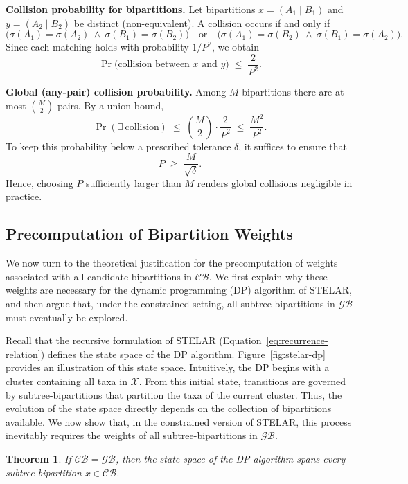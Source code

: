 \documentclass[runningheads]{llncs}
\newtheorem{theorem}{Theorem}[section]
\begin{document}
\textbf{Collision probability for bipartitions.}  
Let bipartitions $x=(A_1 \mid B_1)$ and $y=(A_2 \mid B_2)$ be distinct (non-equivalent).  
A collision occurs if and only if
\[
\big(\sigma(A_1)=\sigma(A_2)\ \wedge\ \sigma(B_1)=\sigma(B_2)\big)
\quad\text{or}\quad
\big(\sigma(A_1)=\sigma(B_2)\ \wedge\ \sigma(B_1)=\sigma(A_2)\big).
\]
Since each matching holds with probability $1/P^2$, we obtain
\[
\Pr\!\big(\text{collision between }x\text{ and }y\big) \;\le\; \frac{2}{P^2}.
\]




\textbf{Global (any-pair) collision probability.}  
Among $M$ bipartitions there are at most $\binom{M}{2}$ pairs. By a union bound,
\[
\Pr(\exists\ \text{collision}) \;\le\; \binom{M}{2}\cdot \frac{2}{P^2}
\;\le\; \frac{M^2}{P^2}.
\]
To keep this probability below a prescribed tolerance $\delta$, it suffices to ensure that
\[
P \;\geq\; \frac{M}{\sqrt{\delta}}.
\]
Hence, choosing $P$ sufficiently larger than $M$ renders global collisions negligible in practice.






\subsection{Precomputation of Bipartition Weights}

We now turn to the theoretical justification for the precomputation of weights associated with all candidate bipartitions in $\mathcal{CB}$. We first explain why these weights are necessary for the dynamic programming (DP) algorithm of STELAR, and then argue that, under the constrained setting, all subtree-bipartitions in $\mathcal{GB}$ must eventually be explored.

Recall that the recursive formulation of STELAR (Equation~\eqref{eq:recurrence-relation}) defines the state space of the DP algorithm. Figure~\ref{fig:stelar-dp} provides an illustration of this state space. Intuitively, the DP begins with a cluster containing all taxa in $\mathcal{X}$. From this initial state, transitions are governed by subtree-bipartitions that partition the taxa of the current cluster. Thus, the evolution of the state space directly depends on the collection of bipartitions available. We now show that, in the constrained version of STELAR, this process inevitably requires the weights of all subtree-bipartitions in $\mathcal{GB}$.

\begin{theorem}
    \label{th:dp-span}
    If $\mathcal{CB} = \mathcal{GB}$, then the state space of the DP algorithm spans every subtree-bipartition $x \in \mathcal{CB}$.
\end{theorem}
\end{document}
